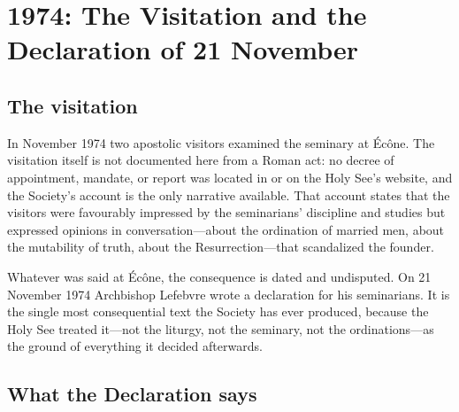 \section{1974: The Visitation and the Declaration of 21 November}

\subsection{The visitation}

In November 1974 two apostolic visitors examined the seminary at Écône.
The visitation itself is not documented here from a Roman act: no decree
of appointment, mandate, or report was located in  or on the Holy See's website, and the Society's account is the
only narrative available. That account states that the visitors were
favourably impressed by the seminarians' discipline and studies but
expressed opinions in conversation---about the ordination of married men,
about the mutability of truth, about the Resurrection---that scandalized
the founder.

Whatever was said at Écône, the consequence is dated and undisputed. On
21 November 1974 Archbishop Lefebvre wrote a declaration for his
seminarians. It is the single most consequential text the Society has
ever produced, because the Holy See treated it---not the liturgy, not the
seminary, not the ordinations---as the ground of everything it decided
afterwards.

\subsection{What the Declaration says}

